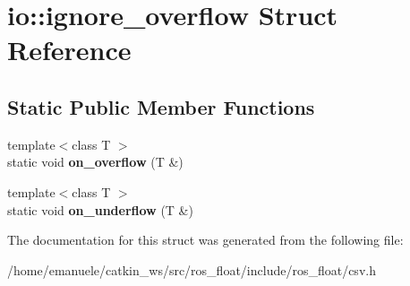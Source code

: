 \hypertarget{structio_1_1ignore__overflow}{}\section{io\+:\+:ignore\+\_\+overflow Struct Reference}
\label{structio_1_1ignore__overflow}
\subsection*{Static Public Member Functions}
\begin{DoxyCompactItemize}
\item 
\mbox{\label{structio_1_1ignore__overflow_aed3e5026cfa7157ea9270ae377d1026b}} 
{\footnotesize template$<$class T $>$ }\\static void {\bfseries on\+\_\+overflow} (T \&)
\item 
\mbox{\label{structio_1_1ignore__overflow_aece692f7a20933149ec99aa1f97458ad}} 
{\footnotesize template$<$class T $>$ }\\static void {\bfseries on\+\_\+underflow} (T \&)
\end{DoxyCompactItemize}


The documentation for this struct was generated from the following file\+:\begin{DoxyCompactItemize}
\item 
/home/emanuele/catkin\+\_\+ws/src/ros\+\_\+float/include/ros\+\_\+float/csv.\+h\end{DoxyCompactItemize}
